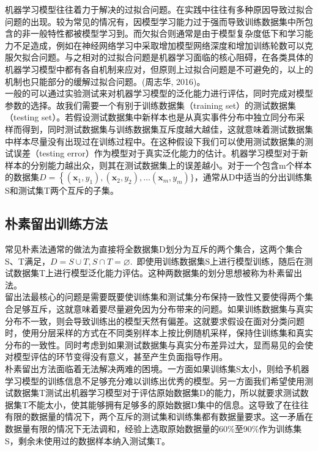  \indent 机器学习模型往往着力于解决的过拟合问题。在实践中往往有多种原因导致过拟合问题的出现。较为常见的情况有，因模型学习能力过于强而导致训练数据集中所包含的非一般特性都被模型学习到。而欠拟合则通常是由于模型复杂度低下和学习能力不足造成，例如在神经网络学习中采取增加模型网络深度和增加训练轮数可以克服欠拟合问题。与之相对的过拟合问题是机器学习面临的核心阻碍，在各类具体的机器学习模型中都有各自机制来应对，但原则上过拟合问题是不可避免的，以上的机制也只能部分的缓解过拟合问题。(周志华, 2016)。\\
 \indent 一般的可以通过实验测试来对机器学习模型的泛化能力进行评估，同时完成对模型参数的选择。故我们需要一个有别于训练数据集（training set）的测试数据集（testing set）。若假设测试数据集中新样本也是从真实事件分布中独立同分布采样而得到，同时测试数据集与训练数据集互斥度越大越佳，这就意味着测试数据集中样本尽量没有出现过在训练过程中。在这种假设下我们可以使用测试数据集的测试误差（testing error）作为模型对于真实泛化能力的估计。机器学习模型对于新样本的分别能力越出众，则其在测试数据集上的误差越小。对于一个包含m个样本的数据集$D=\left\{\left(\boldsymbol{x}_{1}, y_{1}\right),\left(\boldsymbol{x}_{2}, y_{2}\right), \ldots\right.\left(\boldsymbol{x}_{m}, y_{m}\right) \}$，通常从D中适当的分出训练集S和测试集T两个互斥的子集。\\
 \subsection{朴素留出训练方法}
 \indent 常见朴素法通常的做法为直接将全数据集D划分为互斥的两个集合，这两个集合S、T满足，$D=S \cup T, S \cap T=\varnothing$.~即使用训练数据集S上进行模型训练，随后在测试数据集T上进行模型泛化能力评估。这种两数据集的划分思想被称为朴素留出法。\\
 \indent 留出法最核心的问题是需要既要使训练集和测试集分布保持一致性又要使得两个集合足够互斥，这就意味着要尽量避免因为分布带来的问题。如果训练数据集与真实分布不一致，则会导致训练出的模型天然有偏差。这就要求假设在面对分类问题时，使用分层采样的方式在不同类别样本上按比例随机采样，保持住训练集和真实分布的一致性。同时考虑到如果测试数据集与真实分布差异过大，显而易见的会使对模型评估的环节变得没有意义，甚至产生负面指导作用。\\
 \indent 朴素留出方法面临着无法解决两难的困境。一方面如果训练集S太小，则给予机器学习模型的训练信息不足够充分难以训练出优秀的模型。另一方面我们希望使用测试数据集T测试出机器学习模型对于评估原始数据集D的能力，所以就要求测试数据集T不能太小，使其能够拥有足够多的原始数据D集中的信息。这导致了在往往有限的数据量的情况下，两个互斥的测试集和训练集都有数据量要求。这一矛盾在数据量有限的情况下无法调和，经验上选取原始数据量的60\%至90\%作为训练集S，剩余未使用过的数据样本纳入测试集T。\\
